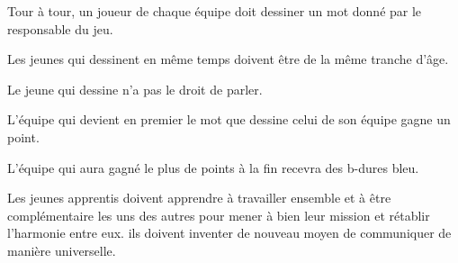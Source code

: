 \documentclass{grand-jeu}
\begin{document}
\begin{liste-materiel}
\end{liste-materiel}

\begin{regles}
Tour à tour, un joueur de chaque équipe doit dessiner un mot donné par le responsable du jeu. 

Les jeunes qui dessinent en même temps doivent être de la même tranche d'âge. 

Le jeune qui dessine n'a pas le droit de parler. 

L'équipe qui devient en premier le mot que dessine celui de son équipe gagne un point. 

L’équipe qui aura gagné le plus de points à la fin recevra des b-dures bleu.
\end{regles}

\begin{imaginaire}
Les jeunes apprentis doivent apprendre à travailler ensemble et à être complémentaire les uns des autres pour mener à bien leur mission et rétablir l'harmonie entre eux. ils doivent inventer de nouveau moyen de communiquer de manière universelle. 
\end{imaginaire}

\begin{moments-stop}
\end{moments-stop}
\end{document}
